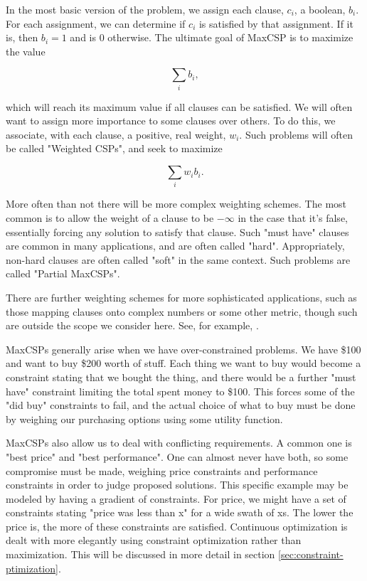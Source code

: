 In the most basic version of the problem, we assign each clause, $c_i$, a boolean, $b_i$. For each assignment, we can determine if $c_i$ is satisfied by that assignment. If it is, then $b_i = 1$ and is $0$ otherwise. The ultimate goal of MaxCSP is to maximize the value

\begin{equation}
    \sum_i b_i,
\end{equation}

which will reach its maximum value if all clauses can be satisfied. We will often want to assign more importance to some clauses over others. To do this, we associate, with each clause, a positive, real weight, $w_i$. Such problems will often be called "Weighted CSPs", and seek to maximize

\begin{equation}
    \sum_i w_i b_i.
\end{equation}

More often than not there will be more complex weighting schemes. The most common is to allow the weight of a clause to be $-\infty$ in the case that it's false, essentially forcing any solution to satisfy that clause. Such "must have" clauses are common in many applications, and are often called "hard". Appropriately, non-hard clauses are often called "soft" in the same context. Such problems are called "Partial MaxCSPs".

\begin{remark}
There are further weighting schemes for more sophisticated applications, such as those mapping clauses onto complex numbers or some other metric, though such are outside the scope we consider here. See, for example, \citep{cai2017complexity}.
\end{remark}

MaxCSPs generally arise when we have over-constrained problems. We have \$100 and want to buy \$200 worth of stuff. Each thing we want to buy would become a constraint stating that we bought the thing, and there would be a further "must have" constraint limiting the total spent money to \$100. This forces some of the "did buy" constraints to fail, and the actual choice of what to buy must be done by weighing our purchasing options using some utility function. 

MaxCSPs also allow us to deal with conflicting requirements. A common one is "best price" and "best performance". One can almost never have both, so some compromise must be made, weighing price constraints and performance constraints in order to judge proposed solutions. This specific example may be modeled by having a gradient of constraints. For price, we might have a set of constraints stating "price was less than x" for a wide swath of xs. The lower the price is, the more of these constraints are satisfied. Continuous optimization is dealt with more elegantly using constraint optimization rather than maximization. This will be discussed in more detail in section \ref{sec:constraint-ptimization}.

